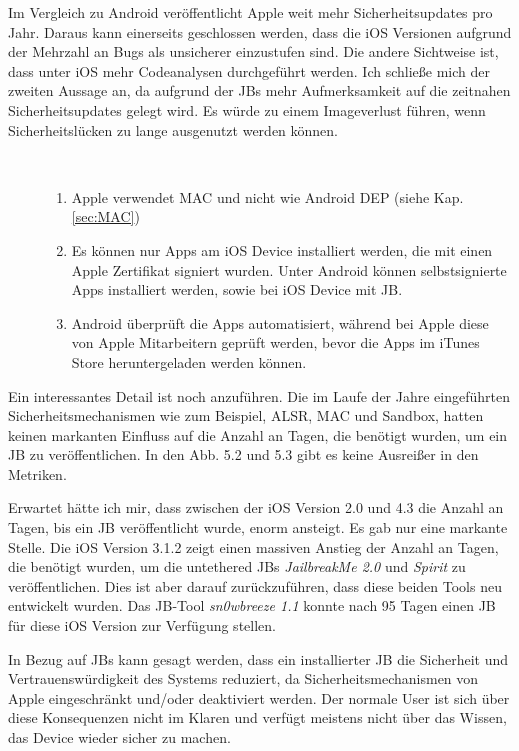 Im Vergleich zu Android veröffentlicht Apple weit mehr Sicherheitsupdates pro Jahr. Daraus kann einerseits geschlossen werden, dass die iOS Versionen aufgrund der Mehrzahl an Bugs als unsicherer einzustufen sind. Die andere Sichtweise ist, dass unter iOS mehr Codeanalysen durchgeführt werden. Ich schließe mich der zweiten Aussage an, da aufgrund der JBs mehr Aufmerksamkeit auf die zeitnahen Sicherheitsupdates gelegt wird. Es würde zu einem Imageverlust führen, wenn Sicherheitslücken zu lange ausgenutzt werden können. \par

\begin{description}
    \item[\parbox{\textwidth} {Auch in Bezug auf die Sicherheitsmechanismen hat Apple weitere Vorteile gegenüber Android}]~\par
    \begin{enumerate}
        \item Apple verwendet MAC und nicht wie Android DEP (siehe Kap. \ref{sec:MAC})
        \item Es können nur Apps am iOS Device installiert werden, die mit einen Apple Zertifikat signiert wurden. Unter Android können selbstsignierte Apps installiert werden, sowie bei iOS Device mit JB.
        \item Android überprüft die Apps automatisiert, während bei Apple diese von Apple Mitarbeitern geprüft werden, bevor die Apps im iTunes Store heruntergeladen werden können.  
    \end{enumerate}
\end{description} 

Ein interessantes Detail ist noch anzuführen. Die im Laufe der Jahre eingeführten Sicherheitsmechanismen wie zum Beispiel, ALSR, MAC und Sandbox, hatten keinen markanten Einfluss auf die Anzahl an Tagen, die benötigt wurden, um ein JB zu veröffentlichen. In den Abb. 5.2 und 5.3 gibt es keine Ausreißer in den Metriken.\par  
Erwartet hätte ich mir, dass zwischen der iOS Version 2.0 und 4.3 die Anzahl an Tagen, bis ein JB veröffentlicht wurde, enorm ansteigt.  Es gab nur eine markante Stelle. Die iOS Version 3.1.2 zeigt einen massiven Anstieg der Anzahl an Tagen, die benötigt wurden, um die untethered JBs \textit{\glqq JailbreakMe 2.0\grqq{}} und \textit{\glqq Spirit\grqq{}} zu veröffentlichen. Dies ist aber darauf zurückzuführen, dass diese beiden Tools neu entwickelt wurden. Das JB-Tool \textit{\glqq sn0wbreeze 1.1\grqq{}} konnte nach 95 Tagen einen JB für diese iOS Version zur Verfügung stellen.\par
 
In Bezug auf JBs kann gesagt werden, dass ein installierter JB die Sicherheit und Vertrauenswürdigkeit des Systems reduziert, da Sicherheitsmechanismen von Apple eingeschränkt und/oder deaktiviert werden. Der normale User ist sich über diese Konsequenzen nicht im Klaren und verfügt meistens nicht über das Wissen, das Device wieder sicher zu machen.

